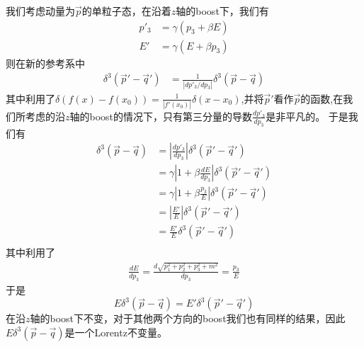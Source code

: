 我们考虑动量为$\vec{p}$的单粒子态，在沿着$z$轴的boost下，我们有
\begin{equation}
\begin{aligned}
p'_{3}&=\gamma(p_{3}+\beta E)\\
E'&=\gamma(E+\beta p_{3})
\end{aligned}
\end{equation}
则在新的参考系中
\begin{equation}
\begin{aligned}
    \delta^{3}(\vec{p}'-\vec{q}')&=\frac{1}{\left|dp'_{3}/dp_{3}\right|}\delta^{3}(\vec{p}-\vec{q})
    \end{aligned}
\end{equation}
其中利用了$\delta(f(x)-f(x_{0}))=\frac{1}{\left|f'(x_{0})\right|}\delta(x-x_{0})$,并将$\vec{p}'$看作$\vec{p}$的函数,在我们所考虑的沿$z$轴的boost的情况下，只有第三分量的导数$\frac{dp'_{3}}{dp_{3}}$是非平凡的。
于是我们有
\begin{equation}
\begin{aligned}
    \delta^{3}(\vec{p}-\vec{q})&=\left|\frac{dp'_{3}}{dp_{3}}\right|\delta^{3}(\vec{p}'-\vec{q}')\\
    &=\gamma\left|1+\beta \frac{dE}{dp_{3}}\right|\delta^{3}(\vec{p}'-\vec{q}')\\
     &=\gamma\left|1+\beta \frac{p_{3}}{E}\right|\delta^{3}(\vec{p}'-\vec{q}')\\
      &=\left|\frac{E'}{E}\right|\delta^{3}(\vec{p}'-\vec{q}')\\
       &=\frac{E'}{E}\delta^{3}(\vec{p}'-\vec{q}')\\
    \end{aligned}
\end{equation}
其中利用了
\begin{equation}
    \begin{aligned}
        \frac{dE}{dp_{3}}=\frac{d\sqrt{p_{1}^{2}+p_{2}^{2}+p_{3}^{2}+m^{2}}}{dp_{3}}=\frac{p_{3}}{E}
    \end{aligned}
\end{equation}
于是
\begin{equation}
    E\delta^{3}(\vec{p}-\vec{q})=E'\delta^{3}(\vec{p}'-\vec{q}')
\end{equation}
在沿$z$轴的boost下不变，对于其他两个方向的boost我们也有同样的结果，因此$ E\delta^{3}(\vec{p}-\vec{q})$是一个Lorentz不变量。

